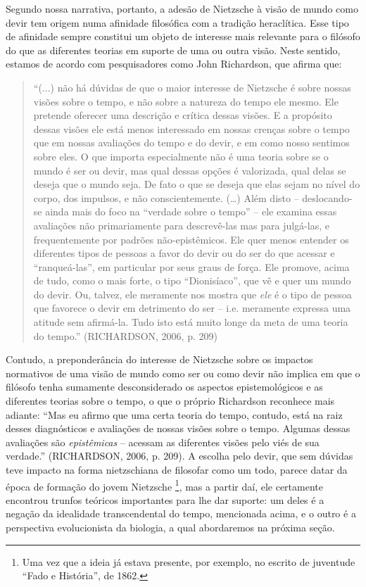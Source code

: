 \documentclass[
	12pt,				%
	openright,			%
	oneside,			%
	a4paper,			%
	english,			%
	french,				%
	spanish,			%
	brazil				%
	]{abntex2}
\begin{document}
Segundo nossa narrativa, portanto, a adesão de Nietzsche à visão de mundo como devir tem origem numa afinidade filosófica com a tradição heraclítica. Esse tipo de afinidade sempre constitui um objeto de interesse mais relevante para o filósofo do que as diferentes teorias em suporte de uma ou outra visão. Neste sentido, estamos de acordo com pesquisadores como John Richardson, que afirma que: 

\begin{quotation}
“(...) não há dúvidas de que o maior interesse de Nietzsche é sobre nossas visões sobre o tempo, e não sobre a natureza do tempo ele mesmo. Ele pretende oferecer uma descrição e crítica dessas visões. E a propósito dessas visões ele está menos interessado em nossas crenças sobre o tempo que em nossas avaliações do tempo e do devir, e em como nosso sentimos sobre eles. O que importa especialmente não é uma teoria sobre se o mundo é ser ou devir, mas qual dessas opções é valorizada, qual delas se deseja que o mundo seja. De fato o que se deseja que elas sejam no nível do corpo, dos impulsos, e não conscientemente. (…) Além disto – deslocando-se ainda mais do foco na “verdade sobre o tempo” – ele examina essas avaliações não primariamente para descrevê-las mas para julgá-las, e frequentemente por padrões não-epistêmicos. Ele quer menos entender os diferentes tipos de pessoas a favor do devir ou do ser do que acessar e “ranqueá-las”, em particular por seus graus de força. Ele promove, acima de tudo, como o mais forte, o tipo “Dionisíaco”, que vê e quer um mundo do devir. Ou, talvez, ele meramente nos mostra que \textit{ele} é o tipo de pessoa que favorece o devir em detrimento do ser – i.e. meramente expressa uma atitude sem afirmá-la. Tudo isto está muito longe da meta de uma teoria do tempo.” (RICHARDSON, 2006, p. 209)
\end{quotation}

Contudo, a preponderância do interesse de Nietzsche sobre os impactos normativos de uma visão de mundo como ser ou como devir não implica em que o filósofo tenha sumamente desconsiderado os aspectos epistemológicos e as diferentes teorias sobre o tempo, o que o próprio Richardson reconhece mais adiante: “Mas eu afirmo que uma certa teoria do tempo, contudo, está na raiz desses diagnósticos e avaliações de nossas visões sobre o tempo. Algumas dessas avaliações são \textit{epistêmicas} – acessam as diferentes visões pelo viés de sua verdade.” (RICHARDSON, 2006, p. 209). A escolha pelo devir, que sem dúvidas teve impacto na forma nietzschiana de filosofar como um todo, parece datar da época de formação do jovem Nietzsche
\footnote{Uma vez que a ideia já estava presente, por exemplo, no escrito de juventude “Fado e História”, de 1862.}, mas a partir daí, ele certamente encontrou trunfos teóricos importantes para lhe dar suporte: um deles é a negação da idealidade transcendental do tempo, mencionada acima, e o outro é a perspectiva evolucionista da biologia, a qual abordaremos na próxima seção.
\end{document}
